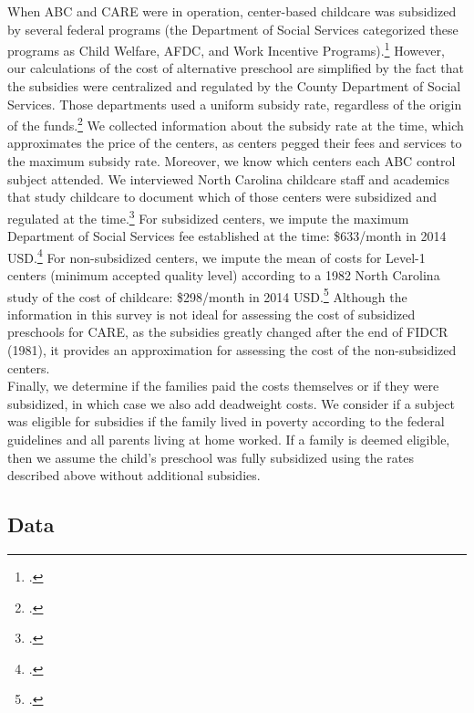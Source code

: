 \noindent When ABC and CARE were in operation, center-based childcare was subsidized by several federal programs (the Department of Social Services categorized these programs as Child Welfare, AFDC, and Work Incentive Programs).\footnote{\citet{NC-State-Dept_1972_Licensed-Day-Care}.} However, our calculations of the cost of alternative preschool are simplified by the fact that the subsidies were centralized and regulated by the County Department of Social Services. Those departments used a uniform subsidy rate, regardless of the origin of the funds.\footnote{\citet{Ad-Hoc-NC_1974_Letter}.} We collected information about the subsidy rate at the time, which approximates the price of the centers, as centers pegged their fees and services to the maximum subsidy rate. Moreover, we know which centers each ABC control subject attended. We interviewed North Carolina childcare staff and academics that study childcare to document which of those centers were subsidized and regulated at the time.\footnote{\citet{Kuperman_2015_Clifford-Russell-Interview,Kuperman-Hojman_2015_Hodgers-Interview}.} For subsidized centers, we impute the maximum Department of Social Services fee established at the time: \$633/month in 2014 USD.\footnote{\citet{Ad-Hoc-NC_1974_Letter,Comm-Plan-Serv_1973_Durhams-Share}.} For non-subsidized centers, we impute the mean of costs for Level-1 centers (minimum accepted quality level) according to a 1982 North Carolina study of the cost of childcare: \$298/month in 2014 USD.\footnote{\citet{NC-Admin-Branch_1982_Day-Care-Cost-Study}.} Although the information in this survey is not ideal for assessing the cost of subsidized preschools for CARE, as the subsidies greatly changed after the end of FIDCR (1981), it provides an approximation for assessing the cost of the non-subsidized centers. \\

\noindent Finally, we determine if the families paid the costs themselves or if they were subsidized, in which case we also add deadweight costs. We consider if a subject was eligible for subsidies if the family lived in poverty according to the federal guidelines and all parents living at home worked. If a family is deemed eligible, then we assume the child's preschool was fully subsidized using the rates described above without additional subsidies.\\

\subsection{Data} \label{appendix:data}

